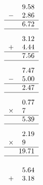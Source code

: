 \documentclass[leqno, 12pt]{article}
\begin{document}
\begin{multicols}{3}
\begin{equation}
    \raisebox{-0.8cm}{
        \begin{tabular}{c S[table-format=1.2]}
         &9.58 \tabularnewline
        $-$&2.86 \tabularnewline
        \hline
         &6.72 \tabularnewline
        \hline
    \end{tabular}}
\end{equation}
\vspace{-1pt}%
\begin{equation}
    \raisebox{-0.8cm}{
        \begin{tabular}{c S[table-format=1.2]}
         &3.12 \tabularnewline
        $+$&4.44 \tabularnewline
        \hline
         &7.56 \tabularnewline
        \hline
    \end{tabular}}
\end{equation}
\vspace{-1pt}%
\begin{equation}
    \raisebox{-0.8cm}{
        \begin{tabular}{c S[table-format=1.2]}
         &7.47 \tabularnewline
        $-$&5.00 \tabularnewline
        \hline
         &2.47 \tabularnewline
        \hline
    \end{tabular}}
\end{equation}
\vspace{-1pt}%
\begin{equation}
    \raisebox{-0.8cm}{
        \begin{tabular}{c S[table-format=1.2]}
         &0.77 \tabularnewline
        $\times$&7 \tabularnewline
        \hline
         &5.39 \tabularnewline
        \hline
    \end{tabular}}
\end{equation}
\vspace{-1pt}%
\begin{equation}
    \raisebox{-0.8cm}{
        \begin{tabular}{c S[table-format=1.2]}
         &2.19 \tabularnewline
        $\times$&9 \tabularnewline
        \hline
         &19.71 \tabularnewline
        \hline
    \end{tabular}}
\end{equation}
\vspace{-1pt}%
\begin{equation}
    \raisebox{-0.8cm}{
        \begin{tabular}{c S[table-format=1.2]}
         &5.64 \tabularnewline
        $+$&3.18 \tabularnewline

\end{tabular}}
\end{equation}
\end{multicols}
\end{document}
